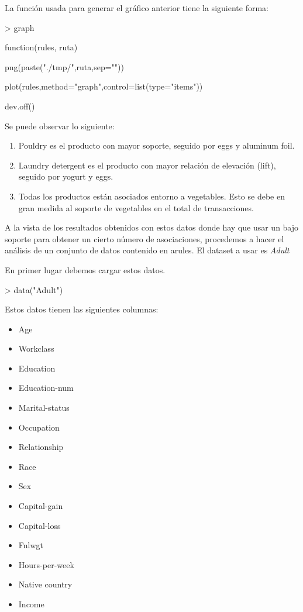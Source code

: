 \documentclass [a4paper] {article}
\begin{document}
{\bigskip
La función usada para generar el gráfico anterior tiene la siguiente forma:
\begin{Schunk}
\begin{Sinput}
> graph
\end{Sinput}
\begin{Soutput}
function(rules, ruta) {

    png(paste("./tmp/",ruta,sep=""))

    plot(rules,method="graph",control=list(type="items"))

    dev.off()
}
\end{Soutput}
\end{Schunk}

\bigskip
Se puede observar lo siguiente: 
\begin{enumerate}
\item Pouldry es el producto con mayor soporte, seguido por eggs y aluminum foil.
\item Laundry detergent es el producto con mayor relación de elevación (lift), seguido por yogurt y eggs.
\item Todas los productos están asociados entorno a vegetables. Esto se debe en gran medida al soporte de vegetables
en el total de transacciones.
\end{enumerate}

\bigskip
A la vista de los resultados obtenidos con estos datos donde hay que usar un bajo soporte para obtener un cierto 
número de asociaciones, procedemos a hacer el análisis de un conjunto de datos contenido en arules. El dataset a usar es
\textit{Adult}

\bigskip
En primer lugar debemos cargar estos datos.
\begin{Schunk}
\begin{Sinput}
> data("Adult")
\end{Sinput}
\end{Schunk}

\bigskip
Estos datos tienen las siguientes columnas:
\begin{itemize}
\item Age
\item Workclass
\item Education
\item Education-num
\item Marital-status
\item Occupation
\item Relationship
\item Race
\item Sex
\item Capital-gain
\item Capital-loss
\item Fnlwgt
\item Hours-per-week
\item Native country
\item Income
\end{itemize}

}
\end{document}
